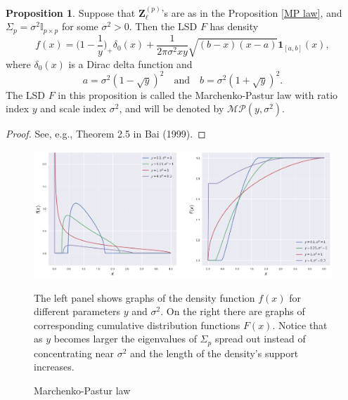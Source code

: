 \documentclass[a4paper,11pt]{book}
\theoremstyle{plain}
\theoremstyle{definition}
\newtheorem{prps}[thm]{Proposition}
\begin{document}
	\begin{prps} \label{one-dim MP}
		Suppose that $\mathbf{Z}_\ell^{(p)}$'s are as in the Proposition \ref{MP law}, and $\Sigma_p = \sigma^2 \mathbb{I}_{p \times p}$ for some $\sigma^2>0$. Then the LSD $F$ has density
		\[ f(x) = \Big(1-\frac{1}{y}\Big)_+\delta_0(x) + \frac{1}{2 \pi \sigma^2 xy} \sqrt{(b-x)(x-a)} \mathbf{1}_{[a,b]}(x), \]
		where $\delta_0(x)$ is a Dirac delta function and
		\[ a = \sigma^2(1-\sqrt{y})^2 \quad \text{and} \quad b = \sigma^2(1+\sqrt{y})^2. \]
		The LSD $F$ in this proposition is called the Marchenko-Pastur law with ratio index $y$ and scale index $\sigma^2$, and will be denoted by $\mathcal{MP}(y, \sigma^2)$.
	\end{prps}
	\begin{proof}
		See, e.g., Theorem 2.5 in Bai (1999).
	\end{proof}
	\begin{figure}
		\begin{center} \centering
			\includegraphics[scale=0.4]{MP}
			\caption{Marchenko-Pastur law}
			\smallskip
			\small
			The left panel shows graphs of the density function $f(x)$ for different parameters $y$ and $\sigma^2$. On the right there are graphs of corresponding cumulative distribution functions $F(x)$. Notice that as $y$ becomes larger the eigenvalues of $\Sigma_p$ spread out instead of concentrating near $\sigma^2$ and the length of the density's support increases.
		\end{center}
	\end{figure}
	
\end{document}
